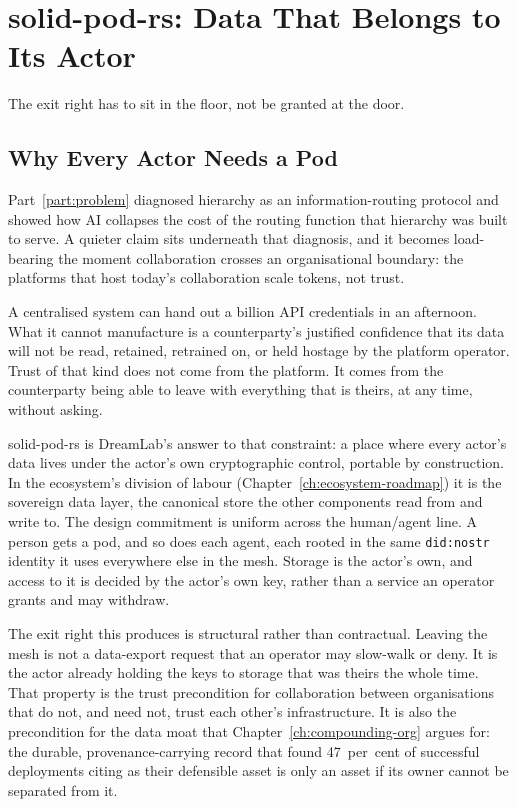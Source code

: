 \chapter{solid-pod-rs: Data That Belongs to Its Actor}
\label{ch:solid-pod}

\epigraph{The exit right has to sit in the floor, not be granted at the door.}{}

\section{Why Every Actor Needs a Pod}

Part~\ref{part:problem} diagnosed hierarchy as an information-routing protocol and showed how AI collapses the cost of the routing function that hierarchy was built to serve. A quieter claim sits underneath that diagnosis, and it becomes load-bearing the moment collaboration crosses an organisational boundary: the platforms that host today's collaboration scale tokens, not trust.

A centralised system can hand out a billion API credentials in an afternoon. What it cannot manufacture is a counterparty's justified confidence that its data will not be read, retained, retrained on, or held hostage by the platform operator. Trust of that kind does not come from the platform. It comes from the counterparty being able to leave with everything that is theirs, at any time, without asking.

solid-pod-rs is DreamLab's answer to that constraint: a place where every actor's data lives under the actor's own cryptographic control, portable by construction. In the ecosystem's division of labour (Chapter~\ref{ch:ecosystem-roadmap}) it is the sovereign data layer, the canonical store the other components read from and write to. The design commitment is uniform across the human/agent line. A person gets a pod, and so does each agent, each rooted in the same \texttt{did:nostr} identity it uses everywhere else in the mesh. Storage is the actor's own, and access to it is decided by the actor's own key, rather than a service an operator grants and may withdraw.

The exit right this produces is structural rather than contractual. Leaving the mesh is not a data-export request that an operator may slow-walk or deny. It is the actor already holding the keys to storage that was theirs the whole time. That property is the trust precondition for collaboration between organisations that do not, and need not, trust each other's infrastructure. It is also the precondition for the data moat that Chapter~\ref{ch:compounding-org} argues for: the durable, provenance-carrying record that \textcite{Pereira2026Playbook} found 47~per~cent of successful deployments citing as their defensible asset is only an asset if its owner cannot be separated from it.

